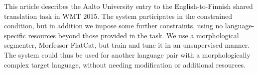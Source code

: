 This article describes the Aalto University entry to the English-to-Finnish shared translation task in WMT 2015. The system participates in the constrained condition, but in addition we impose some further constraints, using no language-specific resources beyond those provided in the task. We use a morphological segmenter, Morfessor FlatCat, but train and tune it in an unsupervised manner. The system could thus be used for another language pair with a morphologically complex target language, without needing modification or additional resources.
